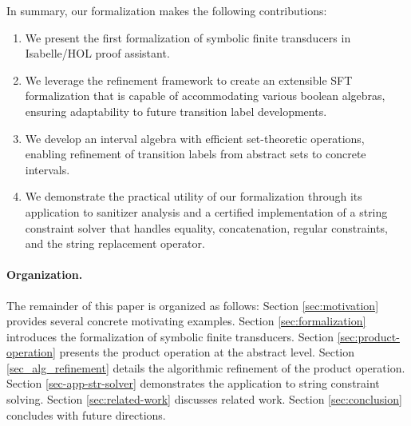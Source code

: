


In summary, our formalization makes the following contributions:
\begin{enumerate}
\item We present the first formalization of symbolic finite transducers in Isabelle/HOL proof assistant.
\item We leverage the refinement framework to create an extensible SFT formalization that is capable of accommodating various boolean algebras, ensuring adaptability to future transition label developments.
\item We develop an interval algebra with efficient set-theoretic operations, enabling refinement of transition labels from abstract sets to concrete intervals.
\item We demonstrate the practical utility of our formalization through its
    application to sanitizer analysis and a certified implementation of
    a string constraint solver that handles equality, concatenation, regular
        constraints, and the string replacement operator.
\end{enumerate}

\paragraph{Organization.}
The remainder of this paper is organized as follows:
Section \ref{sec:motivation} provides several concrete motivating examples.
Section \ref{sec:formalization} introduces the formalization of symbolic finite transducers.
Section \ref{sec:product-operation} presents the product operation at the abstract level.
Section \ref{sec_alg_refinement} details the algorithmic refinement of the product operation.
Section \ref{sec-app-str-solver} demonstrates the application to string constraint solving.
Section \ref{sec:related-work} discusses related work.
Section \ref{sec:conclusion} concludes with future directions.
